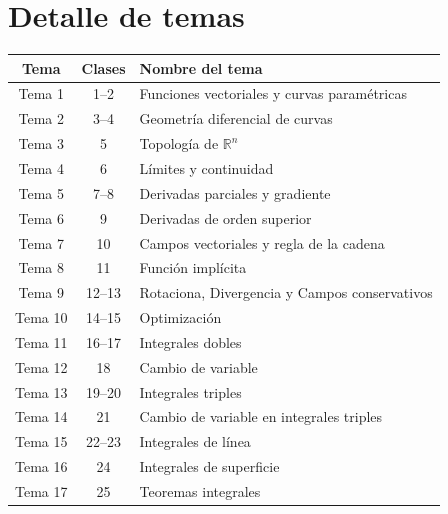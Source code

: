 \documentclass[a4,11pt]{aleph-notas}
\begin{document}
\newpage
\section{Detalle de temas} 

\begin{center}
\small
\begin{tabular}{ccl}
\toprule
Tema & Clases & Nombre del tema \\
\midrule
Tema 1  & 1--2   & Funciones vectoriales y curvas paramétricas \\
Tema 2  & 3--4   & Geometría diferencial de curvas \\
Tema 3  & 5      & Topología de \(\mathbb{R}^n\) \\
Tema 4  & 6      & Límites y continuidad \\
Tema 5  & 7--8   & Derivadas parciales y gradiente \\
Tema 6  & 9      & Derivadas de orden superior \\
Tema 7  & 10     & Campos vectoriales y regla de la cadena \\
Tema 8  & 11     & Función implícita \\
Tema 9  & 12--13 & Rotaciona, Divergencia y Campos conservativos \\
Tema 10 & 14--15 & Optimización \\
Tema 11 & 16--17 & Integrales dobles \\
Tema 12 & 18     & Cambio de variable \\
Tema 13 & 19--20 & Integrales triples \\
Tema 14 & 21     & Cambio de variable en integrales triples \\
Tema 15 & 22--23 & Integrales de línea \\
Tema 16 & 24     & Integrales de superficie \\
Tema 17 & 25     & Teoremas integrales \\
\bottomrule
\end{tabular}
\end{center}
\end{document}
